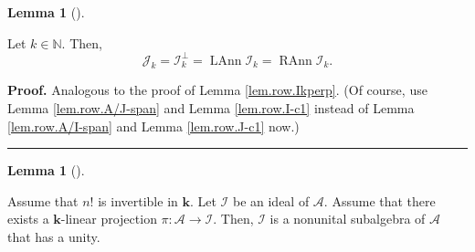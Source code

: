 \documentclass[numbers=enddot,12pt,final,onecolumn,notitlepage]{scrartcl}%
\numberwithin{exer}{subsection}
\theoremstyle{definition}
\newtheorem{lem}[theo]{Lemma}
\newenvironment{lemma}[1][]
{\begin{lem}[#1]\begin{leftbar}}
{\end{leftbar}\end{lem}}
\newenvironment{proof}[1][Proof]{\noindent\textbf{#1.} }{\ \rule{0.5em}{0.5em}}
\begin{document}
\begin{lemma}
\label{lem.row.Jkperp}Let $k\in\mathbb{N}$. Then,
\[
\mathcal{J}_{k}=\mathcal{I}_{k}^{\perp}=\operatorname*{LAnn}\mathcal{I}%
_{k}=\operatorname*{RAnn}\mathcal{I}_{k}.
\]

\end{lemma}

\begin{proof}
Analogous to the proof of Lemma \ref{lem.row.Ikperp}. (Of course, use Lemma
\ref{lem.row.A/J-span} and Lemma \ref{lem.row.I-c1} instead of Lemma
\ref{lem.row.A/I-span} and Lemma \ref{lem.row.J-c1} now.)
\end{proof}

\begin{lemma}
\label{lem.maschke.unital}Assume that $n!$ is invertible in $\mathbf{k}$. Let
$\mathcal{I}$ be an ideal of $\mathcal{A}$. Assume that there exists a
$\mathbf{k}$-linear projection $\pi:\mathcal{A}\rightarrow\mathcal{I}$. Then,
$\mathcal{I}$ is a nonunital subalgebra of $\mathcal{A}$ that has a unity.
\end{lemma}
\end{document}
